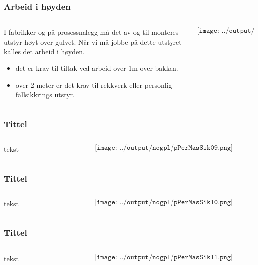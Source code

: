 \documentclass[aspectratio=169,xcolor=dvipsnames]{beamer}
\begin{document}
\begin{frame}
	\frametitle{Arbeid i høyden}
	\begin{columns}
		\begin{column}{0.5\textwidth}
I fabrikker og på prosessnalegg må det av og til monteres utstyr høyt over gulvet. Når vi må jobbe på dette utstyret kalles det arbeid i høyden. 			
\begin{itemize}
	\item det er krav til tiltak ved arbeid over 1m over bakken. 
	\item over 2 meter er det krav til rekkverk eller personlig fallsikkrings utstyr. 
\end{itemize}
		\end{column}

		\begin{column}{0.5\textwidth}
	$$\texttt{[image: ../output/nogpl/pPerMasSik08.png]}$$
		\end{column}
	\end{columns}
\end{frame}

\begin{frame}
	\frametitle{Tittel}
	\begin{columns}
		\begin{column}{0.5\textwidth}
tekst
			
		\end{column}

		\begin{column}{0.5\textwidth}
	$$\texttt{[image: ../output/nogpl/pPerMasSik09.png]}$$
		\end{column}
	\end{columns}
\end{frame}

\begin{frame}
	\frametitle{Tittel}
	\begin{columns}
		\begin{column}{0.5\textwidth}
tekst
			
		\end{column}

		\begin{column}{0.5\textwidth}
	$$\texttt{[image: ../output/nogpl/pPerMasSik10.png]}$$
		\end{column}
	\end{columns}
\end{frame}

\begin{frame}
	\frametitle{Tittel}
	\begin{columns}
		\begin{column}{0.5\textwidth}
tekst
			
		\end{column}

		\begin{column}{0.5\textwidth}
	$$\texttt{[image: ../output/nogpl/pPerMasSik11.png]}$$
		\end{column}
	\end{columns}
\end{frame}
\end{document}
